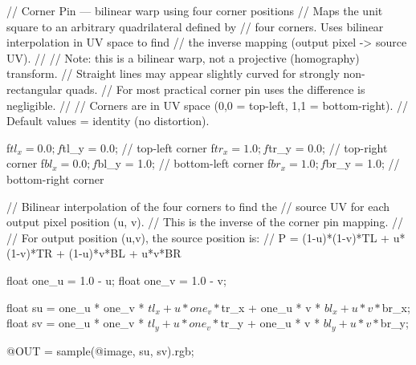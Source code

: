 // Corner Pin — bilinear warp using four corner positions
// Maps the unit square to an arbitrary quadrilateral defined by
// four corners. Uses bilinear interpolation in UV space to find
// the inverse mapping (output pixel -> source UV).
//
// Note: this is a bilinear warp, not a projective (homography) transform.
// Straight lines may appear slightly curved for strongly non-rectangular quads.
// For most practical corner pin uses the difference is negligible.
//
// Corners are in UV space (0,0 = top-left, 1,1 = bottom-right).
// Default values = identity (no distortion).

f$tl_x = 0.0;   f$tl_y = 0.0;    // top-left corner
f$tr_x = 1.0;   f$tr_y = 0.0;    // top-right corner
f$bl_x = 0.0;   f$bl_y = 1.0;    // bottom-left corner
f$br_x = 1.0;   f$br_y = 1.0;    // bottom-right corner

// Bilinear interpolation of the four corners to find the
// source UV for each output pixel position (u, v).
// This is the inverse of the corner pin mapping.
//
// For output position (u,v), the source position is:
//   P = (1-u)*(1-v)*TL + u*(1-v)*TR + (1-u)*v*BL + u*v*BR

float one_u = 1.0 - u;
float one_v = 1.0 - v;

float su = one_u * one_v * $tl_x + u * one_v * $tr_x
         + one_u * v * $bl_x + u * v * $br_x;
float sv = one_u * one_v * $tl_y + u * one_v * $tr_y
         + one_u * v * $bl_y + u * v * $br_y;

@OUT = sample(@image, su, sv).rgb;
